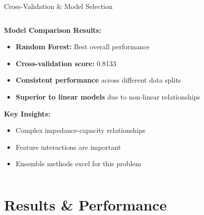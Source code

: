 \documentclass[aspectratio=169]{beamer}
\begin{document}
\begin{frame}{Cross-Validation \& Model Selection}
\begin{columns}
\begin{column}{0.6\textwidth}
\textbf{Model Comparison Results:}
\begin{itemize}
\item \textbf{Random Forest:} Best overall performance
\item \textbf{Cross-validation score:} 0.8133
\item \textbf{Consistent performance} across different data splits
\item \textbf{Superior to linear models} due to non-linear relationships
\end{itemize}

\vspace{0.3cm}
\textbf{Key Insights:}
\begin{itemize}
\item Complex impedance-capacity relationships
\item Feature interactions are important
\item Ensemble methods excel for this problem
\end{itemize}
\end{column}
\begin{column}{0.4\textwidth}
\end{column}

\end{columns}
\end{frame}

\section{Results \& Performance}
\end{document}
